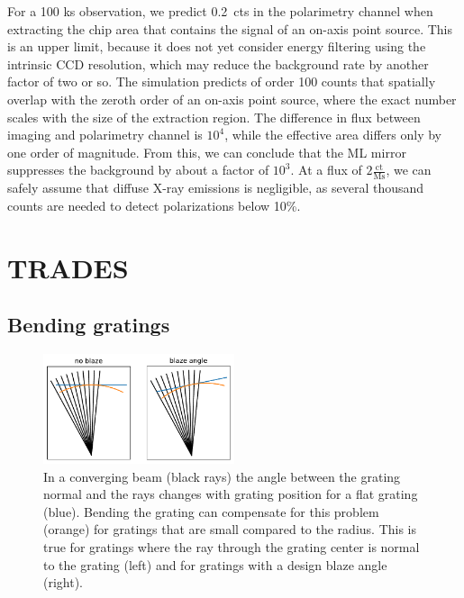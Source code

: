 \documentclass[]{spie}  %
\begin{document}
For a 100 ks observation, we predict 0.2~cts in the polarimetry
channel when extracting the chip area that contains the signal of an
on-axis point source. This is an upper limit, because it does not
yet consider energy filtering using the intrinsic CCD resolution, which
may reduce the background rate by another factor of two or so. The
simulation predicts of order 100 counts that spatially overlap with
the zeroth order of an on-axis point source, where the exact number
scales with the size of the extraction region. The difference in flux
between imaging and polarimetry channel is $10^4$, while the effective
area differs only by one order of magnitude. From this, we can
conclude that the ML mirror suppresses the background by about 
a factor of $10^3$.
At a flux of $2\frac{\mathrm{ct}}{\mathrm{Ms}}$, we can safely assume that
diffuse X-ray emissions is negligible, as several thousand
counts are needed to detect polarizations below 10\%.

\section{TRADES}
\label{sect:trades}

\subsection{Bending gratings}
\label{sect:bend}


\begin{figure} [ht]
\begin{center}
\includegraphics[width=0.5\textwidth]{explainbending}
\end{center}
\caption {\label{fig:explainbending}
In a converging beam (black rays) the angle between the grating normal and the rays changes with grating position for a flat grating (blue). Bending the grating can compensate for this problem (orange) for gratings that are small compared to the radius. This is true for gratings where the ray through the grating center is normal to the grating (left) and for gratings with a design blaze angle (right).
}
\end{figure}
\end{document}

